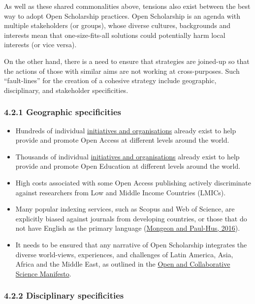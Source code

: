 As well as these shared commonalities above, tensions also exist between
the best way to adopt Open Scholarship practices. Open Scholarship is an
agenda with multiple stakeholders (or groups), whose diverse cultures,
backgrounds and interests mean that one-size-fits-all solutions could
potentially harm local interests (or vice versa).

On the other hand, there is a need to ensure that strategies are
joined-up so that the actions of those with similar aims are not working
at cross-purposes. Such ``fault-lines'' for the creation of a cohesive
strategy include geographic, disciplinary, and stakeholder
specificities.

\subsubsection{4.2.1 Geographic
specificities}\label{geographic-specificities}

\begin{itemize}
\item
  Hundreds of individual
  \href{http://oad.simmons.edu/oadwiki/Advocacy_organizations_for_OA}{initiatives
  and organisations} already exist to help provide and promote Open
  Access at different levels around the world.
\item
  Thousands of individual \href{https://oerworldmap.org/}{initiatives
  and organisations} already exist to help provide and promote Open
  Education at different levels around the world.
\item
  High costs associated with some Open Access publishing actively
  discriminate against researchers from Low and Middle Income Countries
  (LMICs).
\item
  Many popular indexing services, such as Scopus and Web of Science, are
  explicitly biased against journals from developing countries, or those
  that do not have English as the primary language
  (\href{https://doi.org/10.1007/s11192-015-1765-5}{Mongeon and
  Paul-Hus, 2016}).
\item
  It needs to be ensured that any narrative of Open Scholarship
  integrates the diverse world-views, experiences, and challenges of
  Latin America, Asia, Africa and the Middle East, as outlined in the
  \href{https://ocsdnet.org/manifesto/open-science-manifesto/}{Open and
  Collaborative Science Manifesto}.
\end{itemize}

\subsubsection{4.2.2 Disciplinary
specificities}\label{disciplinary-specificities}

